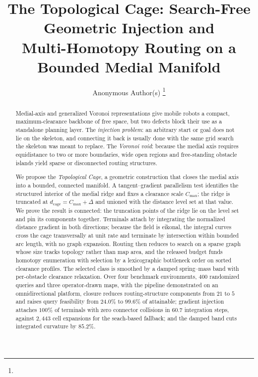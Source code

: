 \documentclass[conference]{IEEEtran}
\begin{document}
\title{\LARGE \bf
The Topological Cage: Search-Free Geometric Injection and \\
Multi-Homotopy Routing on a Bounded Medial Manifold
}

\author{Anonymous Author(s)
\thanks{         }%
}

\maketitle
\thispagestyle{empty}
\pagestyle{empty}

\begin{abstract}
Medial-axis and generalized Voronoi representations give mobile robots a compact, maximum-clearance backbone of free space, but two defects block their use as a standalone planning layer. The \emph{injection problem}: an arbitrary start or goal does not lie on the skeleton, and connecting it back is usually done with the same grid search the skeleton was meant to replace. The \emph{Voronoi void}: because the medial axis requires equidistance to two or more boundaries, wide open regions and free-standing obstacle islands yield sparse or disconnected routing structures.

We propose the \emph{Topological Cage}, a geometric construction that closes the medial axis into a bounded, connected manifold. A tangent--gradient parallelism test identifies the structured interior of the medial ridge and fixes a clearance scale $C_{\max}$; the ridge is truncated at $d_{\mathrm{cage}}=C_{\max}+\Delta$ and unioned with the distance level set at that value. We prove the result is connected: the truncation points of the ridge lie on the level set and pin its components together. Terminals attach by integrating the normalized distance gradient in both directions; because the field is eikonal, the integral curves cross the cage transversally at unit rate and terminate by intersection within bounded arc length, with no graph expansion. Routing then reduces to search on a sparse graph whose size tracks topology rather than map area, and the released budget funds homotopy enumeration with selection by a lexicographic bottleneck order on sorted clearance profiles. The selected class is smoothed by a damped spring--mass band with per-obstacle clearance relaxation. Over four benchmark environments, $400$ randomized queries and three operator-drawn maps, with the pipeline demonstrated on an omnidirectional platform, closure reduces routing-structure components from $21$ to $5$ and raises query feasibility from $24.0\%$ to $99.6\%$ of attainable; gradient injection attaches $100\%$ of terminals with zero connector collisions in $60.7$ integration steps, against $2{,}443$ cell expansions for the seach-based fallback; and the damped band cuts integrated curvature by $85.2\%$.
\end{abstract}
\end{document}
